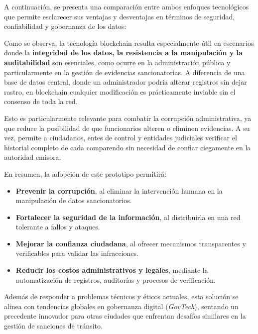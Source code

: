 A continuación, se presenta una comparación entre ambos enfoques tecnológicos que permite esclarecer sus ventajas y desventajas en términos de seguridad, confiabilidad y gobernanza de los datos:



Como se observa, la tecnología blockchain resulta especialmente útil en escenarios donde la \textbf{integridad de los datos, la resistencia a la manipulación y la auditabilidad} son esenciales, como ocurre en la administración pública y particularmente en la gestión de evidencias sancionatorias. A diferencia de una base de datos central, donde un administrador podría alterar registros sin dejar rastro, en blockchain cualquier modificación es prácticamente inviable sin el consenso de toda la red.

Esto es particularmente relevante para combatir la corrupción administrativa, ya que reduce la posibilidad de que funcionarios alteren o eliminen evidencias. A su vez, permite a ciudadanos, entes de control y entidades judiciales verificar el historial completo de cada comparendo sin necesidad de confiar ciegamente en la autoridad emisora.

En resumen, la adopción de este prototipo permitirá:

\begin{itemize}
    \item \textbf{Prevenir la corrupción}, al eliminar la intervención humana en la manipulación de datos sancionatorios.
    \item \textbf{Fortalecer la seguridad de la información}, al distribuirla en una red tolerante a fallos y ataques.
    \item \textbf{Mejorar la confianza ciudadana}, al ofrecer mecanismos transparentes y verificables para validar las infracciones.
    \item \textbf{Reducir los costos administrativos y legales}, mediante la automatización de registros, auditorías y procesos de verificación.
\end{itemize}

Además de responder a problemas técnicos y éticos actuales, esta solución se alinea con tendencias globales en gobernanza digital (\textit{GovTech}), sentando un precedente innovador para otras ciudades que enfrentan desafíos similares en la gestión de sanciones de tránsito. 